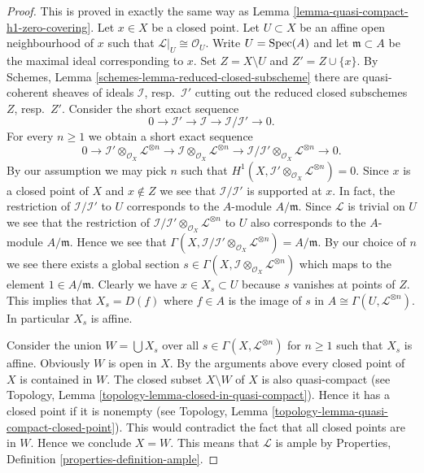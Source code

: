 \begin{proof}
This is proved in exactly the same way as
Lemma \ref{lemma-quasi-compact-h1-zero-covering}.
Let $x \in X$ be a closed point. Let $U \subset X$ be an affine open
neighbourhood of $x$ such that $\mathcal{L}|_U \cong \mathcal{O}_U$.
Write $U = \mathop{\mathrm{Spec}}(A)$ and let
$\mathfrak m \subset A$ be the maximal ideal corresponding to $x$.
Set $Z = X \setminus U$ and $Z' = Z \cup \{x\}$.
By Schemes, Lemma \ref{schemes-lemma-reduced-closed-subscheme} there
are quasi-coherent sheaves of ideals
$\mathcal{I}$, resp.\ $\mathcal{I}'$ cutting out
the reduced closed subschemes $Z$, resp.\ $Z'$.
Consider the short exact sequence
$$
0 \to \mathcal{I}' \to \mathcal{I} \to \mathcal{I}/\mathcal{I}' \to 0.
$$
For every $n \geq 1$ we obtain a short exact sequence
$$
0 \to \mathcal{I}' \otimes_{\mathcal{O}_X} \mathcal{L}^{\otimes n}
\to \mathcal{I} \otimes_{\mathcal{O}_X} \mathcal{L}^{\otimes n} \to
\mathcal{I}/\mathcal{I}' \otimes_{\mathcal{O}_X} \mathcal{L}^{\otimes n} \to 0.
$$
By our assumption we may pick $n$ such that
$H^1(X, \mathcal{I}' \otimes_{\mathcal{O}_X} \mathcal{L}^{\otimes n}) = 0$.
Since $x$ is a closed point of $X$ and $x \not \in Z$ we see that
$\mathcal{I}/\mathcal{I}'$ is supported at $x$. In fact, the restriction
of $\mathcal{I}/\mathcal{I'}$ to $U$ corresponds to the $A$-module
$A/\mathfrak m$. Since $\mathcal{L}$ is trivial on $U$
we see that the restriction of
$\mathcal{I}/\mathcal{I}' \otimes_{\mathcal{O}_X} \mathcal{L}^{\otimes n}$
to $U$ also corresponds to the $A$-module $A/\mathfrak m$.
Hence we see that
$\Gamma(X, \mathcal{I}/\mathcal{I'} \otimes_{\mathcal{O}_X}
\mathcal{L}^{\otimes n}) = A/\mathfrak m$.
By our choice of $n$ we see there exists a global section
$s \in \Gamma(X, \mathcal{I} \otimes_{\mathcal{O}_X} \mathcal{L}^{\otimes n})$
which maps to the element $1 \in A/\mathfrak m$. Clearly we have
$x \in X_s \subset U$ because $s$ vanishes at points of $Z$.
This implies that $X_s = D(f)$ where
$f \in A$ is the image of $s$ in $A \cong \Gamma(U, \mathcal{L}^{\otimes n})$.
In particular $X_s$ is affine.

\medskip\noindent
Consider the union $W = \bigcup X_s$ over all
$s \in \Gamma(X, \mathcal{L}^{\otimes n})$ for $n \geq 1$
such that $X_s$ is affine. Obviously $W$ is open in $X$.
By the arguments above every closed point of
$X$ is contained in $W$. The closed subset $X \setminus W$ of $X$
is also quasi-compact
(see Topology, Lemma \ref{topology-lemma-closed-in-quasi-compact}).
Hence it has a closed point if it is nonempty (see
Topology, Lemma \ref{topology-lemma-quasi-compact-closed-point}).
This would contradict the fact that all closed points are in
$W$. Hence we conclude $X = W$. This means that $\mathcal{L}$
is ample by Properties, Definition \ref{properties-definition-ample}.
\end{proof}

